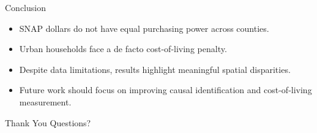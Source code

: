 \documentclass{beamer}
\begin{document}
\begin{frame}{Conclusion}
\begin{itemize}
    \item SNAP dollars do not have equal purchasing power across counties.
    \item Urban households face a de facto cost-of-living penalty.
    \item Despite data limitations, results highlight meaningful spatial disparities.
    \item Future work should focus on improving causal identification and cost-of-living measurement.
\end{itemize}
\end{frame}

\begin{frame}{Thank You}
\centering
Questions?
\end{frame}
\end{document}
